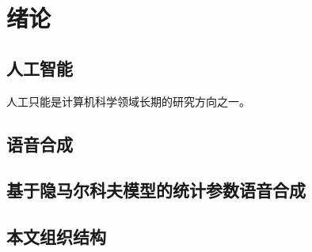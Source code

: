 \section{绪论}

\subsection{人工智能}
人工只能是计算机科学领域长期的研究方向之一。


\subsection{语音合成}

\subsection{基于隐马尔科夫模型的统计参数语音合成}

\subsection{本文组织结构}

